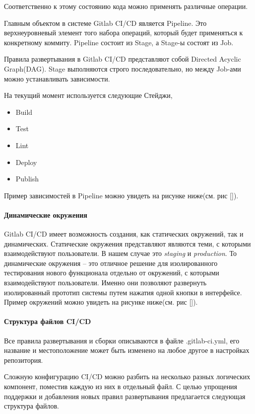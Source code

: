 Соответственно к этому состоянию кода можно применять различные операции.

Главным объектом в системе Gitlab CI/CD является Pipeline. Это верхнеуровневый элемент того набора операций,
который будет применяться к конкретному коммиту.
Pipeline состоит из Stage, а Stage-ы состоят из Job.

Правила развертывания в Gitlab CI/CD представляют собой Directed Acyclic Graph(DAG).
Stage выполняются строго последовательно, но между Job-ами можно устанавливать зависимости.

На текущий момент используется следующие Стейджи,
\begin{itemize}
    \item Build
    \item Test
    \item Lint
    \item Deploy
    \item Publish
\end{itemize}

Пример зависимостей в Pipeline можно увидеть на рисунке ниже(см. рис []).

\paragraph{Динамические окружения}

Gitlab CI/CD имеет возможность создания, как статических окружений, так и динамических.
Статические окружения представляют являются теми, с которыми взаимодействуют пользователи.
В нашем случае это \textit{staging} и \textit{production}.
То динамические окружения -- это отличное решение для изолированного тестирования нового функционала
отдельно от окружений, с которыми взаимодействуют пользователи. Именно они позволяют развернуть
изолированный прототип системы путем нажатия одной кнопки в интерфейсе.
Пример окружений можно увидеть на рисунке ниже(см. рис []).

\paragraph{Структура файлов CI/CD}

Все правила развертывания и сборки описываются в файле .gitlab-ci.yml,
его название и местоположение может быть изменено на любое другое в настройках репозитория.

Сложную конфигурацию CI/CD можно разбить на несколько разных логических компонент, поместив каждую из них
в отдельный файл. С целью упрощения поддержки и добавления новых правил развертывания предлагается следующая структура файлов.

